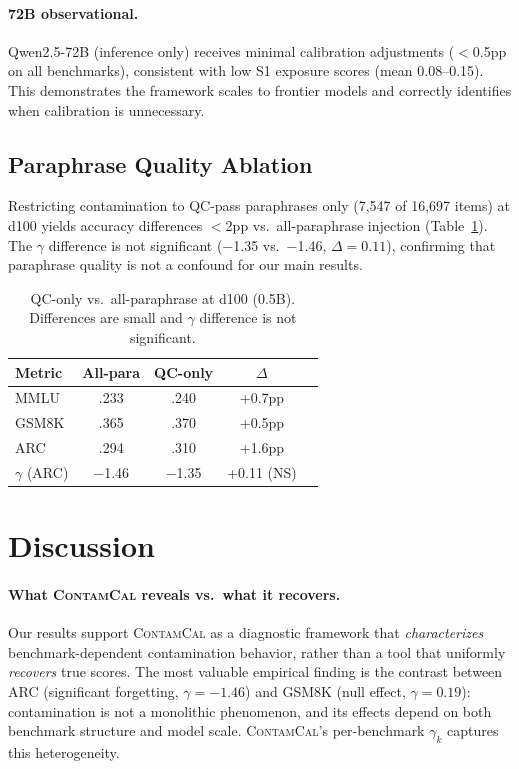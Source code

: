 \documentclass[11pt,a4paper]{article}
\newcommand{\contamcal}{\textsc{ContamCal}}
\begin{document}
\paragraph{72B observational.} Qwen2.5-72B (inference only) receives minimal calibration adjustments ($<$0.5pp on all benchmarks), consistent with low S1 exposure scores (mean 0.08--0.15). This demonstrates the framework scales to frontier models and correctly identifies when calibration is unnecessary.

\subsection{Paraphrase Quality Ablation}
\label{sec:qc_ablation}

Restricting contamination to QC-pass paraphrases only (7,547 of 16,697 items) at d100 yields accuracy differences $<$2pp vs.\ all-paraphrase injection (Table~\ref{tab:qc_ablation}). The $\gamma$ difference is not significant ($-$1.35 vs.\ $-$1.46, $\Delta=0.11$), confirming that paraphrase quality is not a confound for our main results.

\begin{table}[t]
\centering
\small
\caption{QC-only vs.\ all-paraphrase at d100 (0.5B). Differences are small and $\gamma$ difference is not significant.}
\label{tab:qc_ablation}
\begin{tabular}{lcccc}
\toprule
Metric & All-para & QC-only & $\Delta$ \\
\midrule
MMLU & .233 & .240 & +0.7pp \\
GSM8K & .365 & .370 & +0.5pp \\
ARC & .294 & .310 & +1.6pp \\
$\gamma$ (ARC) & $-$1.46 & $-$1.35 & +0.11 (NS) \\
\bottomrule
\end{tabular}
\end{table}

\section{Discussion}
\label{sec:discussion}

\paragraph{What \contamcal{} reveals vs.\ what it recovers.}
Our results support \contamcal{} as a diagnostic framework that \emph{characterizes} benchmark-dependent contamination behavior, rather than a tool that uniformly \emph{recovers} true scores. The most valuable empirical finding is the contrast between ARC (significant forgetting, $\gamma=-1.46$) and GSM8K (null effect, $\gamma=0.19$): contamination is not a monolithic phenomenon, and its effects depend on both benchmark structure and model scale. \contamcal{}'s per-benchmark $\gamma_k$ captures this heterogeneity.
\end{document}
